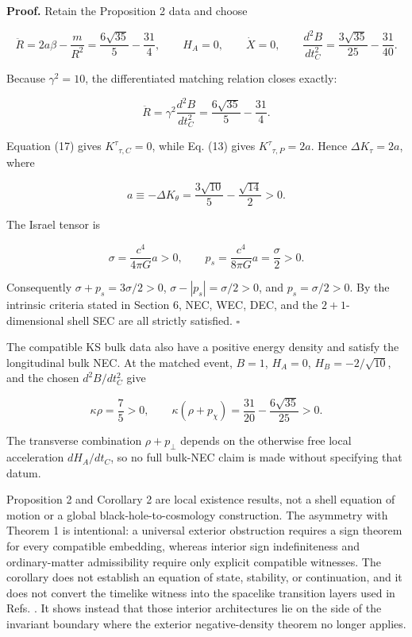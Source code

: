 \documentclass[pdflatex,sn-mathphys-num]{sn-jnl}
\begin{document}
\textbf{Proof.} Retain the Proposition 2 data and choose


\[
\ddot R
=2a\beta-\frac{m}{R^2}
=\frac{6\sqrt{35}}5-\frac{31}{4},
\qquad
H_A=0,
\qquad
\dot X=0,
\qquad
\frac{d^2B}{dt_C^2}
=\frac{3\sqrt{35}}{25}-\frac{31}{40}.
\]

Because \(\gamma^2=10\), the differentiated matching relation closes exactly:


\[
\ddot R
=\gamma^2\frac{d^2B}{dt_C^2}
=\frac{6\sqrt{35}}5-\frac{31}{4}.
\]

Equation (17) gives \(K^\tau{}_{\tau,C}=0\), while Eq. (13) gives \(K^\tau{}_{\tau,P}=2a\). Hence \(\Delta K_\tau=2a\), where


\[
a\equiv-\Delta K_\theta
=\frac{3\sqrt{10}}5-\frac{\sqrt{14}}2>0.
\]

The Israel tensor is


\[
\sigma=\frac{c^4}{4\pi G}a>0,
\qquad
p_s=\frac{c^4}{8\pi G}a=\frac{\sigma}{2}>0.
\]

Consequently \(\sigma+p_s=3\sigma/2>0\), \(\sigma-|p_s|=\sigma/2>0\), and \(p_s=\sigma/2>0\). By the intrinsic criteria stated in Section 6, NEC, WEC, DEC, and the \(2+1\)-dimensional shell SEC are all strictly satisfied. \(\square\)


The compatible KS bulk data also have a positive energy density and satisfy the longitudinal bulk NEC. At the matched event, \(B=1\), \(H_A=0\), \(H_B=-2/\sqrt{10}\), and the chosen \(d^2B/dt_C^2\) give


\[
\kappa\rho=\frac75>0,
\qquad
\kappa(\rho+p_\chi)
=\frac{31}{20}-\frac{6\sqrt{35}}{25}>0.
\]

The transverse combination \(\rho+p_\perp\) depends on the otherwise free local acceleration \(dH_A/dt_C\), so no full bulk-NEC claim is made without specifying that datum.


Proposition 2 and Corollary 2 are local existence results, not a shell equation of motion or a global black-hole-to-cosmology construction. The asymmetry with Theorem 1 is intentional: a universal exterior obstruction requires a sign theorem for every compatible embedding, whereas interior sign indefiniteness and ordinary-matter admissibility require only explicit compatible witnesses. The corollary does not establish an equation of state, stability, or continuation, and it does not convert the timelike witness into the spacelike transition layers used in Refs. \cite{ref8,ref9,ref17}. It shows instead that those interior architectures lie on the side of the invariant boundary where the exterior negative-density theorem no longer applies.
\end{document}
